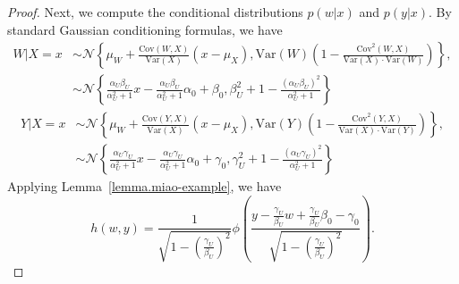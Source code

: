\documentclass[
  12pt]{article}
\def\cN{\mathcal{N}}
\begin{document}
\begin{proof}
Next, we compute the conditional distributions $p(w|x)$ and $p(y|x)$. By standard Gaussian conditioning formulas, we have
\begin{align*}
	W|X=x&\sim \cN\left\{ \mu_W+\frac{\mathrm{Cov}(W,X)}{\mathrm{Var}(X)}(x-\mu_X),\mathrm{Var}(W)\left( 1-\frac{\mathrm{Cov}^2(W,X)}{\mathrm{Var}(X)\cdot \mathrm{Var}(W)} \right) \right\}, \\
	&\sim \cN\left\{ \frac{\alpha_U\beta_U}{\alpha_U^{2}+1}x-\frac{\alpha_U\beta_U}{\alpha_U^{2}+1}\alpha_0+\beta_0,\beta_{U}^{2}+1-\frac{\left( \alpha_U\beta_U \right)^2}{\alpha_U^{2}+1} \right\}
\end{align*}
\begin{align*}
	Y|X=x&\sim \cN\left\{ \mu_W+\frac{\mathrm{Cov}(Y,X)}{\mathrm{Var}(X)}(x-\mu_X),\mathrm{Var}(Y)\left( 1-\frac{\mathrm{Cov}^2(Y,X)}{\mathrm{Var}(X)\cdot \mathrm{Var}(Y)} \right) \right\}, \\
	&\sim \cN\left\{ \frac{\alpha_U\gamma_U}{\alpha_U^{2}+1}x-\frac{\alpha_U\gamma_U}{\alpha_U^{2}+1}\alpha_0+\gamma_0,\gamma_{U}^{2}+1-\frac{\left( \alpha_U\gamma_U \right)^2}{\alpha_U^{2}+1} \right\}
\end{align*}
Applying Lemma~\ref{lemma.miao-example}, we have
$$
h(w,y)=\frac{1}{\sqrt{1-\left( \frac{\gamma_U}{\beta_U} \right)^2}}\phi \left( \frac{y-\frac{\gamma_U}{\beta_U}w+\frac{\gamma_U}{\beta_U}\beta_0-\gamma_0}{\sqrt{1-\left( \frac{\gamma_U}{\beta_U} \right)^2}} \right). 
$$


\end{proof}
\end{document}
